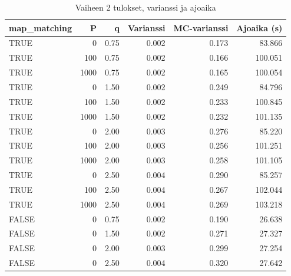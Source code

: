 \documentclass[
  12pt,
  a4paper, twoside]{book}
\begin{document}
\begin{table}

\caption{\label{tab:vaihe-2-tulokset-varianssi}Vaiheen 2 tulokset, varianssi ja ajoaika}
\centering
\begin{tabular}[t]{lrrrrr}
\toprule
map\_matching & P & q & Varianssi & MC-varianssi & Ajoaika (s)\\
\midrule
TRUE & 0 & 0.75 & 0.002 & 0.173 & 83.866\\
TRUE & 100 & 0.75 & 0.002 & 0.166 & 100.051\\
TRUE & 1000 & 0.75 & 0.002 & 0.165 & 100.054\\
TRUE & 0 & 1.50 & 0.002 & 0.249 & 84.796\\
TRUE & 100 & 1.50 & 0.002 & 0.233 & 100.845\\
\addlinespace
TRUE & 1000 & 1.50 & 0.002 & 0.232 & 101.135\\
TRUE & 0 & 2.00 & 0.003 & 0.276 & 85.220\\
TRUE & 100 & 2.00 & 0.003 & 0.256 & 101.251\\
TRUE & 1000 & 2.00 & 0.003 & 0.258 & 101.105\\
TRUE & 0 & 2.50 & 0.004 & 0.290 & 85.257\\
\addlinespace
TRUE & 100 & 2.50 & 0.004 & 0.267 & 102.044\\
TRUE & 1000 & 2.50 & 0.004 & 0.269 & 103.218\\
FALSE & 0 & 0.75 & 0.002 & 0.190 & 26.638\\
FALSE & 0 & 1.50 & 0.002 & 0.271 & 27.327\\
FALSE & 0 & 2.00 & 0.003 & 0.299 & 27.254\\
\addlinespace
FALSE & 0 & 2.50 & 0.004 & 0.320 & 27.642\\
\bottomrule
\end{tabular}
\end{table}
\end{document}
